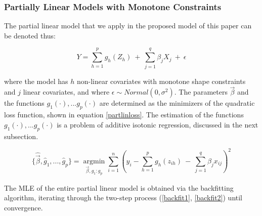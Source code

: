 \documentclass[10pt]{olplainarticle}\usepackage[]{graphicx}\usepackage[]{color}
\begin{document}


% 
% 


\subsubsection{Partially Linear Models with Monotone Constraints} \label{plmmc}

The partial linear model that we apply in the proposed model of this paper can be denoted thus:


\begin{equation} \label{partlinmono}
  Y = \sum_{h=1}^{p} g_{h} (Z_{h}) \ +\  \sum_{j=1}^{q} \beta_{j} X_{j} \ +\ \epsilon
\end{equation}


where the model has $h$ non-linear covariates with monotone shape constraints and $j$ linear covariates, and where $\epsilon \sim Normal(0, \sigma^2)$. The parameters $\vec{\beta}$ and the functions $g_1(\cdot),...g_p(\cdot)$ are determined as the minimizers of the quadratic loss function, shown in equation \ref{partlinloss}. The estimation of the functions $g_1(\cdot),...g_p(\cdot)$ is a problem of additive isotonic regression, discussed in the next subsection.

\begin{equation} \label{partlinloss}
  \{\hat{\vec\beta}, \hat{g}_1,...,\hat{g}_p\} = \underset{\vec{\beta}, g_1:g_p}{\operatorname{argmin}} \sum_{i=1}^{n} (y_i - \sum_{h=1}^{p} g_{h} (z_{ih}) \ -\  \sum_{j=1}^{q} \beta_{j} x_{ij})^2
\end{equation}


The MLE of the entire partial linear model is obtained via the backfitting algorithm, iterating through the two-step process (\ref{backfit1}, \ref{backfit2}) until convergence.
\end{document}
